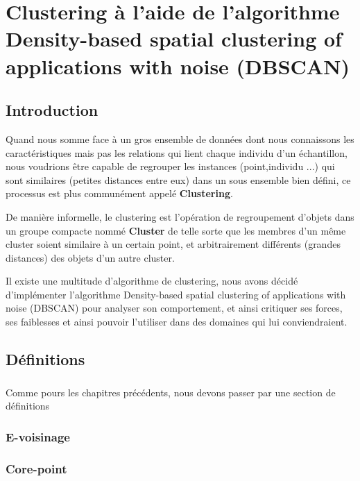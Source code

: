 \chapter{Clustering à l'aide de l'algorithme Density-based spatial clustering of applications with noise (DBSCAN)}
\section{Introduction}
	Quand nous somme face à un gros ensemble de données dont nous connaissons les caractéristiques mais pas les relations qui lient chaque individu d'un échantillon, nous voudrions être capable de regrouper les instances (point,individu ...) qui sont similaires (petites distances entre eux) dans un sous ensemble bien défini, ce processus est plus communément appelé \textbf{Clustering}.
	\par De manière informelle, le clustering est l'opération de regroupement d'objets dans un groupe compacte nommé \textbf{Cluster} de telle sorte que les membres d'un même cluster soient similaire à un certain point, et arbitrairement différents (grandes distances) des objets d'un autre cluster.
	\par 
	Il existe une multitude d'algorithme de clustering, nous avons décidé d'implémenter l'algorithme Density-based spatial clustering of applications with noise (DBSCAN) pour analyser son comportement, et ainsi critiquer ses forces, ses faiblesses et ainsi pouvoir l'utiliser dans des domaines qui lui conviendraient.
\section{Définitions}
	\paragraph{}
	Comme pours les chapitres précédents, nous devons passer par une section de définitions
	\subsection{E-voisinage}
	\paragraph{}
	\subsection{Core-point}
	\paragraph{}
